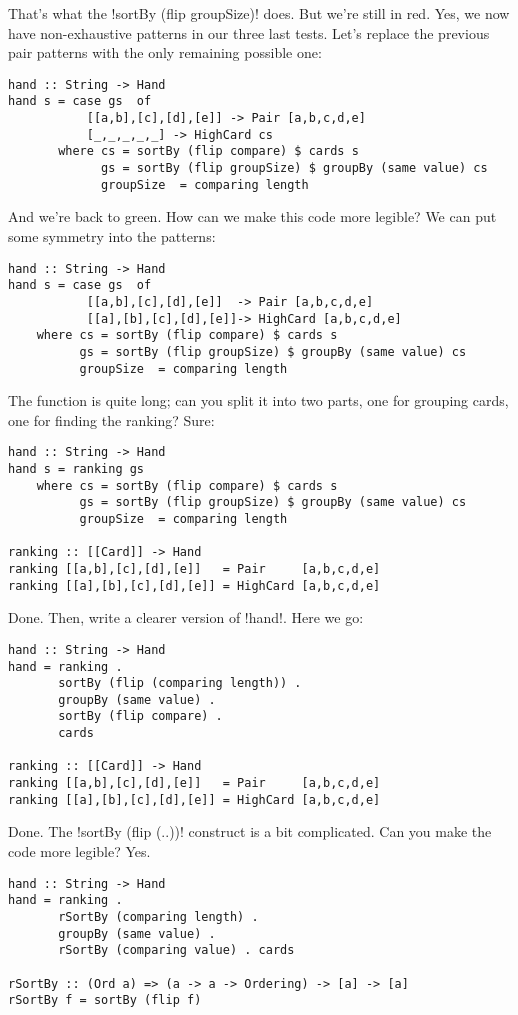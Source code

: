 \failure That's what the \il!sortBy (flip groupSize)! does. But we're still in red.
\lhN Yes, we now have non-exhaustive patterns in our three last tests.
\lhA \failure Let's replace the previous pair patterns with the only remaining possible one:
\begin{lstlisting}[frame=single]
hand :: String -> Hand
hand s = case gs  of
           [[a,b],[c],[d],[e]] -> Pair [a,b,c,d,e]
           [_,_,_,_,_] -> HighCard cs 
       where cs = sortBy (flip compare) $ cards s
             gs = sortBy (flip groupSize) $ groupBy (same value) cs
             groupSize  = comparing length 
\end{lstlisting}
\success And we're back to green.
\lhN How can we make this code more legible?
\lhA We can put some symmetry into the patterns:
\begin{lstlisting}[frame=single]
hand :: String -> Hand
hand s = case gs  of
           [[a,b],[c],[d],[e]]  -> Pair [a,b,c,d,e]
           [[a],[b],[c],[d],[e]]-> HighCard [a,b,c,d,e] 
    where cs = sortBy (flip compare) $ cards s
          gs = sortBy (flip groupSize) $ groupBy (same value) cs
          groupSize  = comparing length 
\end{lstlisting}
\lhN The function is quite long; can you split it into two parts, one for grouping cards, one for finding the ranking?
\lhA \success Sure:
\begin{lstlisting}[frame=single]
hand :: String -> Hand
hand s = ranking gs
    where cs = sortBy (flip compare) $ cards s
          gs = sortBy (flip groupSize) $ groupBy (same value) cs
          groupSize  = comparing length 

ranking :: [[Card]] -> Hand
ranking [[a,b],[c],[d],[e]]   = Pair     [a,b,c,d,e]
ranking [[a],[b],[c],[d],[e]] = HighCard [a,b,c,d,e] 
\end{lstlisting}
\success Done.
\newpage
\lhN Then, write a clearer version of \il!hand!.
\lhA Here we go:
\begin{lstlisting}[frame=single]
hand :: String -> Hand
hand = ranking .
       sortBy (flip (comparing length)) .
       groupBy (same value) .
       sortBy (flip compare) .
       cards

ranking :: [[Card]] -> Hand
ranking [[a,b],[c],[d],[e]]   = Pair     [a,b,c,d,e]
ranking [[a],[b],[c],[d],[e]] = HighCard [a,b,c,d,e] 
\end{lstlisting}
\success Done.
\lhN The \il!sortBy (flip (..))! construct is a bit complicated. Can you make the code more legible?
\lhA Yes. 
\begin{lstlisting}[frame=single]
hand :: String -> Hand
hand = ranking . 
       rSortBy (comparing length) .
       groupBy (same value) . 
       rSortBy (comparing value) . cards

rSortBy :: (Ord a) => (a -> a -> Ordering) -> [a] -> [a]
rSortBy f = sortBy (flip f)
\end{lstlisting}

